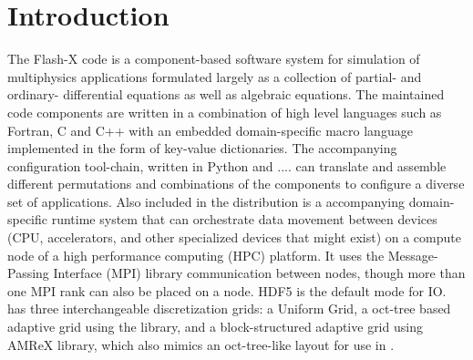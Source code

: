 
\chapter{Introduction}
\label{Sec:Introduction}

The Flash-X code is a component-based software system for simulation
of multiphysics applications formulated largely as a collection of
partial- and ordinary- differential equations as well as algebraic
equations. The maintained code components are written in a combination of high
level languages such as Fortran, C and C++ with an embedded
domain-specific macro language implemented in the form of key-value
dictionaries. The accompanying configuration tool-chain, written in Python and .... 
can translate and assemble different permutations and combinations of
the components to configure a diverse set of applications.  
Also included in the distribution is a accompanying domain-specific
runtime system that can orchestrate data movement between devices
(CPU, accelerators, and other specialized devices that might exist) on a
compute node of a high performance computing (HPC) platform. 
It uses the Message-Passing Interface (MPI) library communication
between nodes, though more than one MPI rank can also be placed on a
node. HDF5 is the default mode for IO. \flashx has three
interchangeable discretization grids: a Uniform Grid, a 
oct-tree based adaptive grid using the \Paramesh
library, and a block-structured adaptive grid using AMReX library,
which also mimics an oct-tree-like layout for use in \flashx.


 